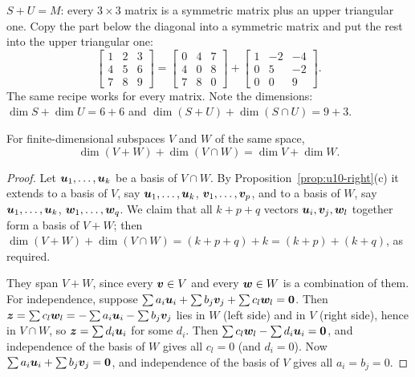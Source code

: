 \begin{example}\label{ex:u12-SU}
$S+U=M$: every $3\times3$ matrix is a symmetric matrix plus an upper triangular one. Copy the part
below the diagonal into a symmetric matrix and put the rest into the upper triangular one:
\[
\begin{bmatrix}1&2&3\\4&5&6\\7&8&9\end{bmatrix}
=\begin{bmatrix}0&4&7\\4&0&8\\7&8&0\end{bmatrix}
+\begin{bmatrix}1&-2&-4\\0&5&-2\\0&0&9\end{bmatrix}.
\]
The same recipe works for every matrix. Note the dimensions: $\dim S+\dim U=6+6$ and
$\dim(S+U)+\dim(S\cap U)=9+3$.
\end{example}

\begin{theorem}\label{thm:u12-sumdim}
For finite-dimensional subspaces $V$ and $W$ of the same space,
\[
\dim(V+W)+\dim(V\cap W)=\dim V+\dim W.
\]
\end{theorem}
\begin{proof}
Let $\boldsymbol{u}_1,\dots,\boldsymbol{u}_k$ be a basis of $V\cap W$. By Proposition~\ref{prop:u10-right}(c)
it extends to a basis of $V$, say $\boldsymbol{u}_1,\dots,\boldsymbol{u}_k$, $\boldsymbol{v}_1,\dots,\boldsymbol{v}_p$, and to a
basis of $W$, say $\boldsymbol{u}_1,\dots,\boldsymbol{u}_k$, $\boldsymbol{w}_1,\dots,\boldsymbol{w}_q$. We claim that all $k+p+q$
vectors $\boldsymbol{u}_i,\boldsymbol{v}_j,\boldsymbol{w}_l$ together form a basis of $V+W$; then
$\dim(V+W)+\dim(V\cap W)=(k+p+q)+k=(k+p)+(k+q)$, as required.

They span $V+W$, since every $\boldsymbol{v}\in V$ and every $\boldsymbol{w}\in W$ is a combination of them. For
independence, suppose $\sum a_i\boldsymbol{u}_i+\sum b_j\boldsymbol{v}_j+\sum c_l\boldsymbol{w}_l=\boldsymbol{0}$. Then
$\boldsymbol{z}=\sum c_l\boldsymbol{w}_l=-\sum a_i\boldsymbol{u}_i-\sum b_j\boldsymbol{v}_j$ lies in $W$ (left side) and in $V$
(right side), hence in $V\cap W$, so $\boldsymbol{z}=\sum d_i\boldsymbol{u}_i$ for some $d_i$. Then
$\sum c_l\boldsymbol{w}_l-\sum d_i\boldsymbol{u}_i=\boldsymbol{0}$, and independence of the basis of $W$ gives all
$c_l=0$ (and $d_i=0$). Now $\sum a_i\boldsymbol{u}_i+\sum b_j\boldsymbol{v}_j=\boldsymbol{0}$, and independence of the
basis of $V$ gives all $a_i=b_j=0$.
\end{proof}

